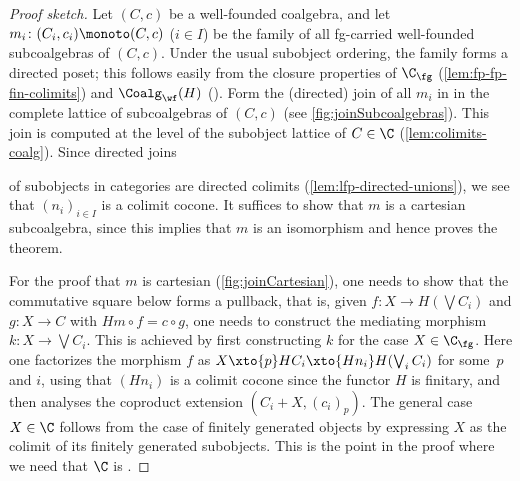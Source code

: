 \begin{proof}[Proof sketch]
Let $(C,c)$ be a well-founded coalgebra, and let $m_i\colon (C_i,c_i)\monoto (C,c)$ ($i\in I$) be the family of all fg-carried well-founded subcoalgebras of $(C,c)$. Under the usual subobject ordering, the family forms a directed poset; this follows easily from the closure properties of $\C_\fg$ (\autoref{lem:fp-fp-fin-colimits}) and $\Coalg_{\wf}(H)$ (). Form the (directed) join of all $m_i$ in
in the complete lattice of subcoalgebras of $(C,c)$ (see \autoref{fig:joinSubcoalgebras}). This join is computed at the level of the subobject lattice of $C\in \C$ (\autoref{lem:colimits-coalg}). Since directed joins 


\noindent of subobjects in \lfp categories are directed colimits (\autoref{lem:lfp-directed-unions}), we see that $(n_i)_{i\in I}$ is a colimit cocone. It suffices to show that $m$ is a cartesian subcoalgebra, since this implies that $m$ is an isomorphism and hence proves the theorem. 

For the proof that $m$ is cartesian (\autoref{fig:joinCartesian}), one needs to show that the commutative square below forms a pullback, that is, given $f\colon X\to H(\bigvee C_i)$ and $g\colon X\to C$ with
$Hm\circ f = c\circ g$, one
needs to construct the mediating morphism $k\colon X\to \bigvee C_i$. This is achieved by first constructing $k$ for the case $X\in \C_\fg$. Here one factorizes the morphism $f$ as $X\xto{p} HC_i \xto{Hn_i} H(\bigvee_i C_i)$ for some~$p$ and $i$, using that $(Hn_i)$ is a colimit cocone since the functor $H$ is finitary, and then analyses the coproduct extension $(C_i+X,(c_i)_p)$. The general case $X\in \C$ follows from the case 
of finitely generated objects by expressing $X$ as the colimit of its finitely generated subobjects. This is the point in the proof where we need that $\C$ is \lfp. 
\end{proof}

